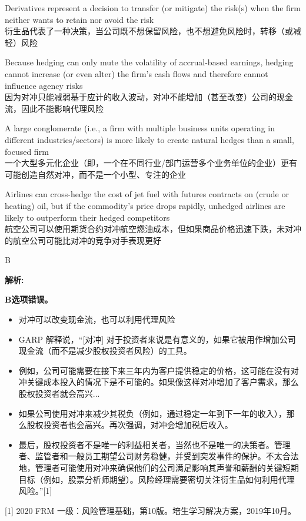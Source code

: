 \documentclass{article}
\newenvironment{explanation}
{\textbf{解析:}\par}
{\par}
\begin{document}
\begin{choices}
    \item Derivatives represent a decision to transfer (or mitigate) the risk(s) when the firm neither wants to retain nor avoid the risk
    \\衍生品代表了一种决策，当公司既不想保留风险，也不想避免风险时，转移（或减轻）风险
    \item Because hedging can only mute the volatility of accrual-based earnings, hedging cannot increase (or even alter) the firm's cash flows and therefore cannot influence agency risks
    \\因为对冲只能减弱基于应计的收入波动，对冲不能增加（甚至改变）公司的现金流，因此不能影响代理风险
    \item A large conglomerate (i.e., a firm with multiple business units operating in different industries/sectors) is more likely to create natural hedges than a small, focused firm
    \\一个大型多元化企业（即，一个在不同行业/部门运营多个业务单位的企业）更有可能创造自然对冲，而不是一个小型、专注的企业
    \item Airlines can cross-hedge the cost of jet fuel with futures contracts on (crude or heating) oil, but if the commodity's price drops rapidly, unhedged airlines are likely to outperform their hedged competitors
    \\航空公司可以使用期货合约对冲航空燃油成本，但如果商品价格迅速下跌，未对冲的航空公司可能比对冲的竞争对手表现更好
\end{choices}

\begin{correctanswer}
    B
\end{correctanswer}

\begin{explanation}
    \textbf{B选项错误。} 
    \begin{itemize}
        \item 对冲可以改变现金流，也可以利用代理风险
        \item GARP 解释说，“[对冲] 对于投资者来说是有意义的，如果它被用作增加公司现金流（而不是减少股权投资者风险）的工具。
        \item 例如，公司可能需要在接下来三年内为客户提供稳定的价格，这可能在没有对冲关键成本投入的情况下是不可能的。如果像这样对冲增加了客户需求，那么股权投资者就会高兴... 
        \item 如果公司使用对冲来减少其税负（例如，通过稳定一年到下一年的收入），那么股权投资者也会高兴。再次强调，对冲会增加税后收入。
        \item 最后，股权投资者不是唯一的利益相关者，当然也不是唯一的决策者。管理者、监管者和一般员工期望公司财务稳健，并受到突发事件的保护。不太合法地，管理者可能使用对冲来确保他们的公司满足影响其声誉和薪酬的关键短期目标（例如，股票分析师期望）。风险经理需要密切关注衍生品如何利用代理风险。”[1]
    \end{itemize}
    
    [1] 2020 FRM 一级：风险管理基础，第10版。培生学习解决方案，2019年10月。
\end{explanation}
\end{document}
